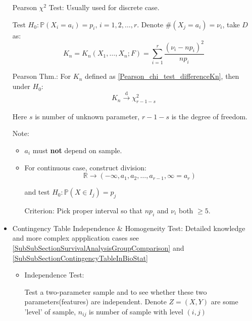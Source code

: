 \begin{itemize}
            Pearson $\chi^2$ Test: Usually used for discrete case. 
            
            Test $H_0:\mathbb{P}(X_i=a_i)=p_i,\, i=1,2,\ldots,r$. Denote $\#(X_j=a_i)=\nu_i$, take $D$ as:
            \begin{equation}\label{Pearson_chi_test_differenceKn}
                K_n=K_n(X_1,\ldots,X_n;F)=\sum_{i=1}^r\frac{(\nu_i-np_i)^2}{np_i}
            \end{equation}

            Pearson Thm.: For $K_n$ defined as \autoref{Pearson_chi_test_differenceKn}, then under $H_0$:
            \begin{equation}
                K_n\xrightarrow[]{\mathrm{d}}\chi^2_{r-1-s}
            \end{equation} 

            Here $s$ is number of unknown parameter, $r-1-s$ is the degree of freedom.

            Note:
            \begin{itemize}
                \item $a_i$ must \textbf{not} depend on sample.
                \item For continuous case, construct division:
                \begin{equation}\mathbb{R}\rightarrow(-\infty,a_1,a_2,\ldots,a_{r-1},\infty=a_r) \end{equation}

                and test $H_0:\mathbb{P}(X\in I_j)=p_j$

                Criterion: Pick proper interval so that $np_i$ and $\nu_i$ both $\geq 5$.
            \end{itemize}
 


        \item Contingency Table Independence \& Homogeneity Test: Detailed knowledge and more complex appplication cases see \autoref{SubSubSectionSurvivalAnalysisGroupComparison} and \autoref{SubSubSectionContingencyTableInBioStat}


 
\begin{itemize}
    \item Independence Test:
    
    Test a two-parameter sample and to see whether these two parameters(features) are independent. Denote $Z=(X,Y)$ are some 'level' of sample, $n_{ij}$ is number of sample with level $(i,j)$


\end{itemize}
\end{itemize}
